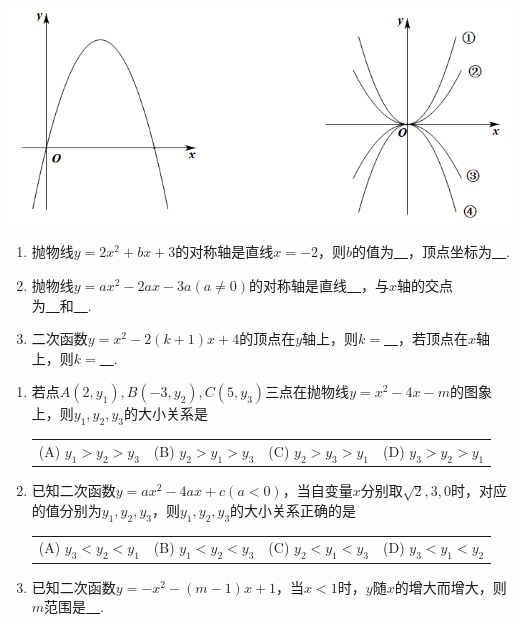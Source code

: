 \documentclass[10pt]{ctexart}
\newcommand{\onech}[4]{
\renewcommand\arraystretch{1.4}
\begin{tabularx}{\linewidth}{XXXX}
\setlength\tabcolsep{0pt}
(A) #1 & (B) #2 & (C) #3 & (D) #4 \\
\end{tabularx}
\unskip \unskip}
\begin{document}
\includegraphics[scale=0.6]{figure/l-2.PNG} 
\begin{dkyi}{}{}
  \begin{enumerate}[(1)]
  \item 抛物线$y=2x^2+bx+3$的对称轴是直线$x=-2$，则$b$的值为\underline{~\hspace{1cm}~}，顶点坐标为\underline{~\hspace{1cm}~}.
  \item 抛物线$y=ax^2-2ax-3a(a\neq 0)$的对称轴是直线\underline{~\hspace{1cm}~}，与$x$轴的交点为\underline{~\hspace{1cm}~}和\underline{~\hspace{1cm}~}.
  \item 二次函数$y=x^2-2(k+1)x+4$的顶点在$y$轴上，则$k=$\underline{~\hspace{1cm}~}，若顶点在$x$轴上，则$k=$\underline{~\hspace{1cm}~}.
  \end{enumerate}
\end{dkyi}
\begin{dkyi}{}{}
  \begin{enumerate}[(1)]
  \item 若点$A(2,y_1),B(-3,y_2),C(5,y_3)$三点在抛物线$y=x^2-4x-m$的图象上，则$y_1,y_2,y_3$的大小关系是
  \onech{$y_1>y_2>y_3$}{$y_2>y_1>y_3$}{$y_2>y_3>y_1$}{$y_3>y_2>y_1$}
  
  \item 已知二次函数$y=ax^2-4ax+c(a<0)$，当自变量$x$分别取$\sqrt{2},3,0$时，对应的值分别为$y_1,y_2,y_3$，则$y_1,y_2,y_3$的大小关系正确的是
 
  \onech{$y_3<y_2<y_1$}{$y_1<y_2<y_3$}{$y_2<y_1<y_3$}{$y_3<y_1<y_2$}
 
  \item 已知二次函数$y=-x^2-(m-1)x+1$，当$x<1$时，$y$随$x$的增大而增大，则$m$范围是\underline{~\hspace{1cm}~}.
  \end{enumerate}
\end{dkyi}
\end{document}
